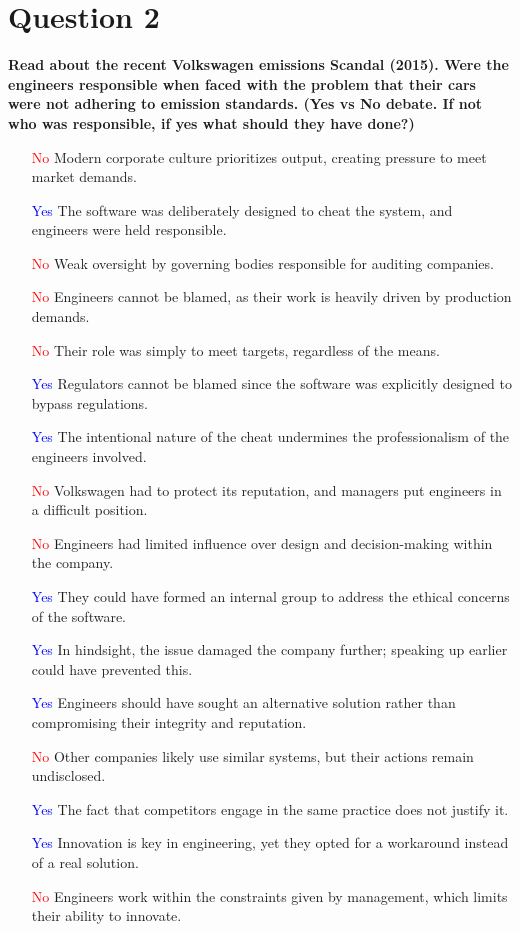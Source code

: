 \documentclass[12pt]{article}
\begin{document}
\section{Question 2}
\textbf{Read about the recent Volkswagen emissions Scandal (2015). Were the engineers responsible when faced with the problem that their cars were not adhering to emission standards. (Yes vs No debate. If not who was responsible, if yes what should they have done?)}

\begin{itemize}
    \item [\textcolor{red}{No}] Modern corporate culture prioritizes output, creating pressure to meet market demands.
    \item [\textcolor{blue}{Yes}] The software was deliberately designed to cheat the system, and engineers were held responsible.
    \item [\textcolor{red}{No}] Weak oversight by governing bodies responsible for auditing companies.
    \item [\textcolor{red}{No}] Engineers cannot be blamed, as their work is heavily driven by production demands.
    \item [\textcolor{red}{No}] Their role was simply to meet targets, regardless of the means.
    \item [\textcolor{blue}{Yes}] Regulators cannot be blamed since the software was explicitly designed to bypass regulations.
    \item [\textcolor{blue}{Yes}] The intentional nature of the cheat undermines the professionalism of the engineers involved.
    \item [\textcolor{red}{No}] Volkswagen had to protect its reputation, and managers put engineers in a difficult position.
    \item [\textcolor{red}{No}] Engineers had limited influence over design and decision-making within the company.
    \item [\textcolor{blue}{Yes}] They could have formed an internal group to address the ethical concerns of the software.
    \item [\textcolor{blue}{Yes}] In hindsight, the issue damaged the company further; speaking up earlier could have prevented this.
    \item [\textcolor{blue}{Yes}] Engineers should have sought an alternative solution rather than compromising their integrity and reputation.
    \item [\textcolor{red}{No}] Other companies likely use similar systems, but their actions remain undisclosed.
    \item [\textcolor{blue}{Yes}] The fact that competitors engage in the same practice does not justify it.
    \item [\textcolor{blue}{Yes}] Innovation is key in engineering, yet they opted for a workaround instead of a real solution.
    \item [\textcolor{red}{No}] Engineers work within the constraints given by management, which limits their ability to innovate.
\end{itemize}
\end{document}
